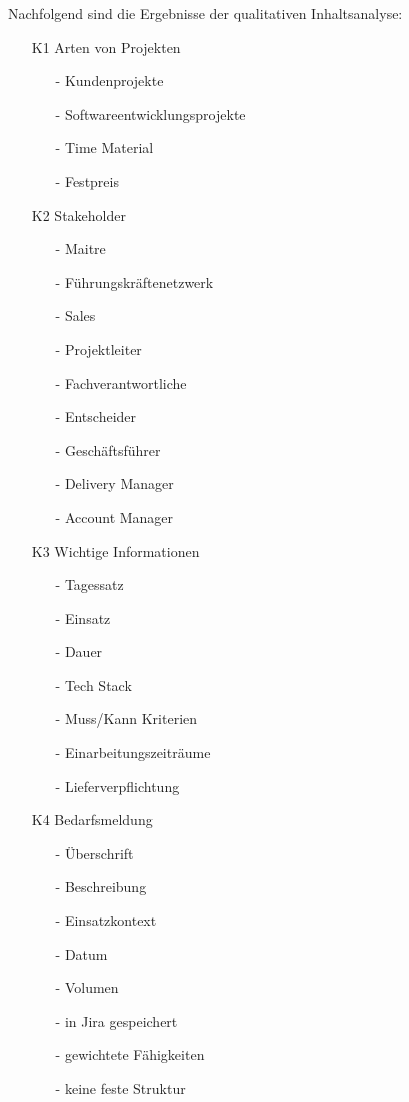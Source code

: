 Nachfolgend sind die Ergebnisse der qualitativen Inhaltsanalyse:
\begin{itemize}
	\item[K1] Arten von Projekten
	\begin{itemize}
		\item[-] Kundenprojekte
		\item[-] Softwareentwicklungsprojekte
		\item[-] Time Material
		\item[-] Festpreis
	\end{itemize}
	\item[K2] Stakeholder
	\begin{itemize}
		\item[-] Maitre
		\item[-] Führungskräftenetzwerk
		\item[-] Sales
		\item[-] Projektleiter
		\item[-] Fachverantwortliche
		\item[-] Entscheider
		\item[-] Geschäftsführer
		\item[-] Delivery Manager
		\item[-] Account Manager
	\end{itemize}
	\item[K3] Wichtige Informationen
	\begin{itemize}
		\item[-] Tagessatz
		\item[-] Einsatz
		\item[-] Dauer
		\item[-] Tech Stack
		\item[-] Muss/Kann Kriterien
		\item[-] Einarbeitungszeiträume
		\item[-] Lieferverpflichtung
	\end{itemize}
	\item[K4] Bedarfsmeldung
	\begin{itemize}
		\item[-] Überschrift
		\item[-] Beschreibung
		\item[-] Einsatzkontext
		\item[-] Datum
		\item[-] Volumen
		\item[-] in Jira gespeichert
		\item[-] gewichtete Fähigkeiten
		\item[-] keine feste Struktur

\end{itemize}
\end{itemize}
